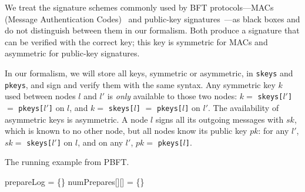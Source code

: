 We treat the signature schemes commonly used by BFT protocols---MACs (Message Authentication Codes)~\cite{MAC} and public-key signatures~\cite{signature}---as black boxes and do not distinguish between them in our formalism.
Both produce a signature that can be verified with the correct key; this key is symmetric for MACs and asymmetric for public-key signatures.

In our  formalism, we will store all keys, symmetric or asymmetric, in \texttt{skeys} and \texttt{pkeys}, and sign and verify them with the same syntax.
Any symmetric key $k$ used between nodes $l$ and $l'$ is \emph{only} available to those two nodes: $k=$ \texttt{skeys[$l'$]} $=$ \texttt{pkeys[$l'$]} on $l$, and $k=$ \texttt{skeys[$l$]} $=$ \texttt{pkeys[$l$]} on $l'$.
The availability of asymmetric keys is asymmetric.
A node $l$ signs all its outgoing messages with $sk$, which is known to no other node, but all nodes know its public key $pk$: for any $l'$, $sk=$ \texttt{skeys[$l'$]} on $l$, and on any $l'$, $pk=$ \texttt{pkeys[$l$]}.


\begin{algorithm}
\caption{The running example from PBFT.}
\label{alg:running-example}
prepareLog = \{\}\;
numPrepares[][] = \{\}\;

\end{algorithm}



